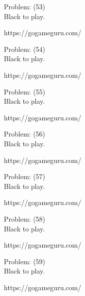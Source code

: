 \documentclass[11pt]{article}
\begin{document}
\begin{minipage}[t]{0.5\textwidth}
  {\centering
  
Problem: (53)\\
Black to play.

https://gogameguru.com/\\
  }
\end{minipage}
\begin{minipage}[t]{0.5\textwidth}
  {\centering
  
Problem: (54)\\
Black to play.

https://gogameguru.com/\\
  }
\end{minipage}
\begin{minipage}[t]{0.5\textwidth}
  {\centering
  
Problem: (55)\\
Black to play.

https://gogameguru.com/\\
  }
\end{minipage}
\begin{minipage}[t]{0.5\textwidth}
  {\centering
  
Problem: (56)\\
Black to play.

https://gogameguru.com/\\
  }
\end{minipage}
\begin{minipage}[t]{0.5\textwidth}
  {\centering
  
Problem: (57)\\
Black to play.

https://gogameguru.com/\\
  }
\end{minipage}
\begin{minipage}[t]{0.5\textwidth}
  {\centering
  
Problem: (58)\\
Black to play.

https://gogameguru.com/\\
  }
\end{minipage}
\begin{minipage}[t]{0.5\textwidth}
  {\centering
  
Problem: (59)\\
Black to play.

https://gogameguru.com/\\
  }
\end{minipage}
\end{document}
